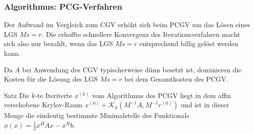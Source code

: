 \subsubsection{Algorithmus: PCG-Verfahren}

Der Aufwand im Vergleich zum CGV erhöht sich beim PCGV um das Lösen eines LGS $Ms=r$. Die erhoffte schnellere
Konvergenz des Iterationsverfahren macht sich also nur bezahlt, wenn das LGS $Ms=r$ entsprechend billig gelöst
werden kann. 

Da $A$ bei Anwendung des CGV typischerweise dünn besetzt ist, dominieren die Kosten für die Lösung des LGS $Ms=r$ 
bei dem Gesamtkosten des PCGV.

\begin{colbox}{Satz}
  Die $k$-te Iteriterte $x^{(k)}$ vom Algorithmus des PCGV liegt in dem affin verschobene Krylov-Raum
  $x^{(0)} + \mathcal{K}_k(M^{-1}A, M^{-1}r^{(0)})$ und ist in dieser Menge die eindeutig bestimmte Minimalstelle
  des Funktionals $\phi(x) = \tfrac{1}{2}x^HAx-x^Hb$.
\end{colbox}

